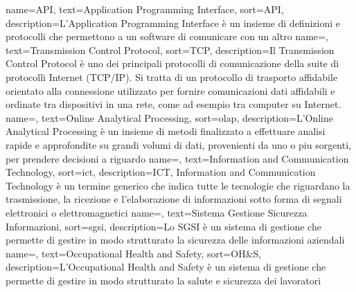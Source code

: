 {
    name={API},
    text=Application Programming Interface,
    sort=API,
    description={L'Application Programming Interface è un insieme di definizioni e protocolli che permettono a un software di comunicare con un altro}
}
 {
    name=,
    text=Transmission Control Protocol,
    sort=TCP,
    description={Il Transmission Control Protocol è uno dei principali protocolli di comunicazione della suite di protocolli Internet (TCP/IP). Si tratta di un protocollo di trasporto affidabile orientato alla connessione utilizzato per fornire comunicazioni dati affidabili e ordinate tra dispositivi in una rete, come ad esempio tra computer su Internet.}
}
 {
    name=,
    text=Online Analytical Processing,
    sort=olap,
    description={L'Online Analytical Processing è un insieme di metodi finalizzato a effettuare analisi rapide e approfondite su grandi volumi di dati, provenienti da uno o piu sorgenti, per prendere decisioni a riguardo}
}
 {
    name=,
    text=Information and Communication Technology,
    sort=ict,
    description={ICT, Information and Communication Technology è un termine generico che indica tutte le tecnologie che riguardano la trasmissione, la ricezione e l'elaborazione di informazioni sotto forma di segnali elettronici o elettromagnetici}
}
 {
    name=,
    text=Sistema Gestione Sicurezza Informazioni,
    sort=sgsi,
    description={Lo SGSI è un sistema di gestione che permette di gestire in modo strutturato la sicurezza delle informazioni aziendali}
}
 {
    name=,
    text=Occupational Health and Safety,
    sort=OH\&S,
    description={L'Occupational Health and Safety è un sistema di gestione che permette di gestire in modo strutturato la salute e sicurezza dei lavoratori}
}
